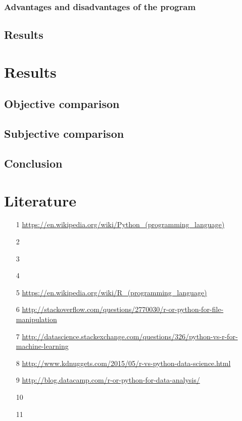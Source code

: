 \documentclass{article}
\begin{document}
\subsubsection{Advantages and disadvantages of the program}
\subsection{Results}

\newpage
\section{Results}
\subsection{Objective comparison}
\subsection{Subjective comparison}
\subsection{Conclusion}

\newpage
\section{Literature}
\begin{enumerate}
    \item[1] \url{https://en.wikipedia.org/wiki/Python_(programming_language)}
    \item[2]
    \item[3]
    \item[4]
    \item[5] \url{https://en.wikipedia.org/wiki/R_(programming_language)}
    \item[6] \url{http://stackoverflow.com/questions/2770030/r-or-python-for-file-manipulation}
    \item[7] \url{http://datascience.stackexchange.com/questions/326/python-vs-r-for-machine-learning}
    \item[8] \url{http://www.kdnuggets.com/2015/05/r-vs-python-data-science.html}
    \item[9] \url{http://blog.datacamp.com/r-or-python-for-data-analysis/}
    \item[10]
    \item[11]
\end{enumerate}
\end{document}
